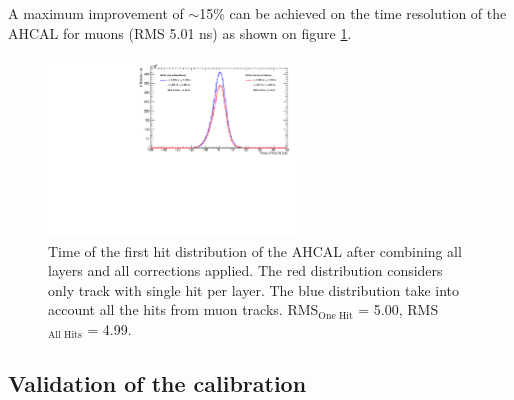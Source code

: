 \documentclass[twoside,a4paper,11pt]{article}
\begin{document}
A maximum improvement of $\sim$15\% can be achieved on the time resolution of the AHCAL for muons (RMS 5.01 ns) as shown on figure \ref{fig:timing_muons}.
\begin{figure}[htbp]
\begin{center}
\includegraphics[width=0.6\textwidth]{fig/Timing_Muons.pdf}
\caption{Time of the first hit distribution of the AHCAL after combining all layers and all corrections applied. The red distribution considers only track with single hit per layer. The blue distribution take into account all the hits from muon tracks. RMS$_{\text{One Hit}}$ = 5.00, RMS$_{\text{All Hits}}$ = 4.99.}
\label{fig:timing_muons}
\end{center}
\end{figure}
\subsection{Validation of the calibration}
\label{subsec:validation}
\end{document}
